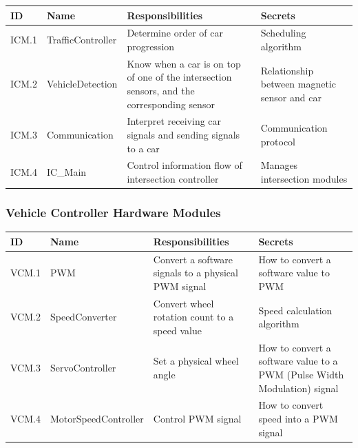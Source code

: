 \documentclass [10pt]{article}
\begin{document}
\begin{longtable}{ |p{ }  | p{ } |  p{ } |  p{ } |}  \hline
    
    \textbf{ID} & \textbf{Name} &  \textbf{Responsibilities} & \textbf{Secrets} \\ \hline
    
    \cellcolor{tableCell}ICM.1  & \cellcolor{tableCell}TrafficController & \cellcolor{tableCell}Determine order of car progression & \cellcolor{tableCell} Scheduling algorithm \\ \hline
    
    ICM.2 & VehicleDetection & Know when a car is on top of one of the intersection sensors, and the corresponding sensor & Relationship between magnetic sensor and car \\ \hline
    
    \cellcolor{tableCell}ICM.3  & \cellcolor{tableCell}Communication & \cellcolor{tableCell}Interpret receiving car signals and sending signals to a car & \cellcolor{tableCell}Communication protocol \\ \hline
    
    
        ICM.4 & IC\_Main & Control information flow of intersection controller & Manages intersection modules \\ \hline

\end{longtable}






\subsubsection{Vehicle Controller Hardware Modules}

\begin{longtable}{ |p{ }  | p{ } |  p{ } |  p{ } |}  \hline
    
    \textbf{ID} & \textbf{Name} &  \textbf{Responsibilities} & \textbf{Secrets} \\ \hline 
    
    
    \cellcolor{tableCell}VCM.1  & \cellcolor{tableCell}PWM & \cellcolor{tableCell}Convert a software signals to a physical PWM signal & \cellcolor{tableCell}How to convert a software value to PWM  \\ \hline
    
    VCM.2 & SpeedConverter & Convert wheel rotation count to a speed value & Speed calculation algorithm \\ \hline
    
    \cellcolor{tableCell}VCM.3  & \cellcolor{tableCell}ServoController & \cellcolor{tableCell}Set a physical wheel angle & 
    \cellcolor{tableCell}How to convert a software value to a PWM (Pulse Width Modulation) signal \\ \hline
    
    VCM.4 & MotorSpeedController & Control PWM signal & How to convert speed into a PWM signal \\ \hline\hline
    
\end{longtable}
\end{document}
